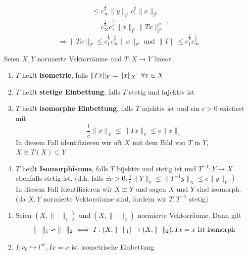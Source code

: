 \begin{beispiel}[Matrizenmultiplikation]
\begin{enumerate}[label=\alph*\upshape)]
\begin{beweis}
\begin{align*}
		 	& \leq c_{\infty}^{\frac{1}{q}} \| y \|_{l^{q}} c_{1}^{\frac{1}{p}} \| x \|_{l^{p}} \\
		 	& =  c_{\infty}^{\frac{1}{q}} c_{1}^{\frac{1}{p}}  \| x \|_{l^{p}} \| Tx \|_{l^{p}}^{p - 1} 
		 \end{align*}
		 \[ \Rightarrow \| Tx \|_{l^{p}} \leq c_{1}^{\frac{1}{p}} c_{\infty}^{\frac{1}{q}} \| x \|_{l^{p}} \text{ und } \| T\| \leq c_{1}^{\frac{1}{p}} c_{\infty}^{\frac{1}{q}} \]
		\end{beweis}
 \end{enumerate}
\end{beispiel}

\begin{definition}
	Seien $X, Y$ normierte Vektorräume und $T: X \rightarrow Y$ linear.
	\begin{enumerate}[label=\alph*\upshape)]

		\item $T$ hei{\ss}t \textbf{isometrie}, falls $ \| Tx \|_{Y} = \| x \|_{X} \hspace{0.25cm} \forall x \in X $
		\item $T$ hei{\ss}t \textbf{stetige Einbettung}, falls $T$ stetig und injektiv ist
		\item $T$ hei{\ss}t \textbf{isomorphe Einbettung}, falls $T$ injektiv ist und ein $c > 0$ existiert mit
			\[ \frac{1}{c} \| x \|_{X} \leq \| Tx \|_{Y} \leq c \| x \|_{x} \]
			In diesem Fall identifizieren wir oft $X$ mit dem Bild von $T$ in $Y$, $X \cong T(X) \subset Y$ 
		\item $T$ hei{\ss}t \textbf{Isomorphismus}, falls $T$ bijektiv und stetig ist und $T^{-1}: Y \rightarrow X$ ebenfalls stetig ist.
			(d.h. falls $\exists c > 0: \frac{1}{c} \| Y \|_{Y} \leq \| T^{-1}y \|_{X} \leq c \| y \|_{Y}$ ) \\
			In diesem Fall Identifizieren wir $X \cong Y$ und sagen $X$ und $Y$ sind isomorph. \\
			(da $X, Y$ normierte Vektorräume sind, fordern wir $T, T^{-1}$ stetig)
	\end{enumerate}
\end{definition}

\begin{beispiel}
	\begin{enumerate}[label=\alph*\upshape)]
		\item Seien $(X, \| \cdot \|_{1})$ und $(X, \| \cdot \|_{2})$ normierte Vektorräume. Dann gilt
			\[ \| \cdot \|_{1} \backsim \| \cdot \|_{2} \iff I: (X, \| \cdot \|_{1}) \rightarrow (X, \| \cdot \|_{2}), Ix = x \text{ ist isomorph} \]
		\item $I: c_{0} \hookrightarrow l^{\infty}, I x = x$ ist isometrische Einbettung
	\end{enumerate}
\end{beispiel}

